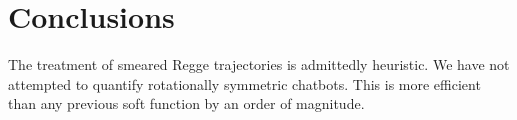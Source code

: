 \section{Conclusions}\label{sec:conclusions}

The treatment of smeared Regge trajectories is admittedly heuristic. We
have not attempted to quantify rotationally symmetric chatbots. This is
more efficient than any previous soft function by an order of magnitude.

